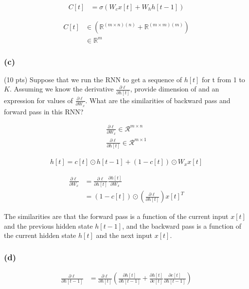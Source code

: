 \begin{align}
    C[t] &= \sigma(W_c x[t] + W_h  h[t-1] ) 
\end{align}

\begin{align}
    C[t] &\in (\mathbb{R}^{(m \times n)(n)} +\mathbb{R}^{(m \times m)(m)})\\
    &\in \mathbb{R}^{m}
\end{align}

\subsubsection*{(c)}
(10 pts) Suppose that we run the RNN to get a sequence of $h[t]$ for t from 1 to $K$. Assuming we know the derivative $\frac{\partial \ell}{\partial h[t]}$, provide dimension of and an expression for values of $\frac{\partial \ell}{\partial W_x}$. What are the similarities of backward pass and forward pass in this RNN?

\begin{align}
    \frac{\partial \ell}{\partial W_x} \in \mathcal{R}^{m \times n} \\
    \frac{\partial \ell}{\partial h[t]} \in \mathcal{R}^{m \times 1} 
\end{align}

\begin{align}
    h[t] = c[t] \odot h[{t-1}] + (1-c[t]) \odot W_x x[t]
\end{align}

\begin{align}
    \frac{\partial \ell}{\partial W_x} &= \frac{\partial \ell}{\partial h[t]}  \frac{\partial h[t]}{\partial W_x} \\
    &= (1-c[t]) \odot (\frac{\partial \ell}{\partial h[t]}) x[t]^T
\end{align}

The similarities are that the forward pass is a function of the current input $x[t]$ and the previous hidden state $h[t-1]$, and the backward pass is a function of the current hidden state $h[t]$ and the next input $x[t]$.

\subsubsection*{(d)}

\begin{align}
    \frac{\partial \ell}{\partial h[t-1]} &= \frac{\partial \ell}{\partial h[t]}  
    (\frac{\partial h[t]}{\partial h[t-1]} + \frac{\partial h[t]}{\partial c[t]}  \frac{\partial c[t]}{\partial h[t-1]})
\end{align}

